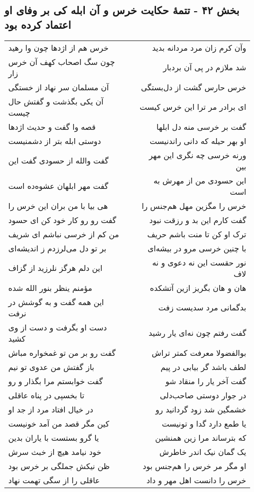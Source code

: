\begin{center}
\section*{بخش ۴۲ - تتمهٔ حکایت خرس و آن ابله کی بر وفای او اعتماد کرده بود}
\label{sec:sh042}
\begin{longtable}{l p{0.5cm} r}
خرس هم از اژدها چون وا رهید
&&
وآن کرم زان مرد مردانه بدید
\\
چون سگ اصحاب کهف آن خرس زار
&&
شد ملازم در پی آن بردبار
\\
آن مسلمان سر نهاد از خستگی
&&
خرس حارس گشت از دل‌بستگی
\\
آن یکی بگذشت و گفتش حال چیست
&&
ای برادر مر ترا این خرس کیست
\\
قصه وا گفت و حدیث اژدها
&&
گفت بر خرسی منه دل ابلها
\\
دوستی ابله بتر از دشمنیست
&&
او بهر حیله که دانی راندنیست
\\
گفت والله از حسودی گفت این
&&
ورنه خرسی چه نگری این مهر بین
\\
گفت مهر ابلهان عشوه‌ده است
&&
این حسودی من از مهرش به است
\\
هی بیا با من بران این خرس را
&&
خرس را مگزین مهل هم‌جنس را
\\
گفت رو رو کار خود کن ای حسود
&&
گفت کارم این بد و رزقت نبود
\\
من کم از خرسی نباشم ای شریف
&&
ترک او کن تا منت باشم حریف
\\
بر تو دل می‌لرزدم ز اندیشه‌ای
&&
با چنین خرسی مرو در بیشه‌ای
\\
این دلم هرگز نلرزید از گزاف
&&
نور حقست این نه دعوی و نه لاف
\\
مؤمنم ینظر بنور الله شده
&&
هان و هان بگریز ازین آتشکده
\\
این همه گفت و به گوشش در نرفت
&&
بدگمانی مرد سدیست زفت
\\
دست او بگرفت و دست از وی کشید
&&
گفت رفتم چون نه‌ای یار رشید
\\
گفت رو بر من تو غمخواره مباش
&&
بوالفضولا معرفت کمتر تراش
\\
باز گفتش من عدوی تو نیم
&&
لطف باشد گر بیابی در پیم
\\
گفت خوابستم مرا بگذار و رو
&&
گفت آخر یار را منقاد شو
\\
تا بخسپی در پناه عاقلی
&&
در جوار دوستی صاحب‌دلی
\\
در خیال افتاد مرد از جد او
&&
خشمگین شد زود گردانید رو
\\
کین مگر قصد من آمد خونیست
&&
یا طمع دارد گدا و تونیست
\\
یا گرو بستست با یاران بدین
&&
که بترساند مرا زین همنشین
\\
خود نیامد هیچ از خبث سرش
&&
یک گمان نیک اندر خاطرش
\\
ظن نیکش جملگی بر خرس بود
&&
او مگر مر خرس را هم‌جنس بود
\\
عاقلی را از سگی تهمت نهاد
&&
خرس را دانست اهل مهر و داد
\\
\end{longtable}
\end{center}
